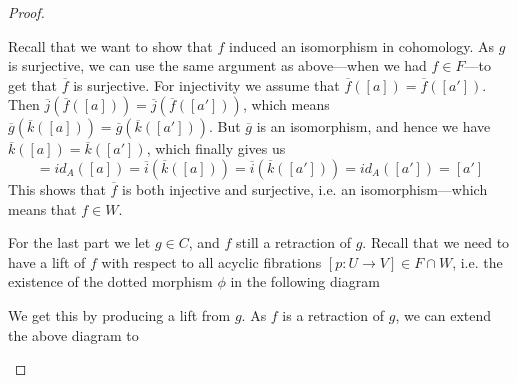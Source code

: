 \begin{proof}
\begin{center}
\end{center}

Recall that we want to show that $f$ induced an isomorphism in cohomology. As $g$ is surjective, we can use the same argument as above---when we had $f\in F$---to get that $\overline{f}$ is surjective. For injectivity we assume that $\overline{f}([a]) = \overline{f}([a'])$. Then $\overline{j}(\overline{f}([a])) = \overline{j}(\overline{f}([a']))$, which means $\overline{g}(\overline{k}([a])) = \overline{g}(\overline{k}([a']))$. But $\overline{g}$ is an isomorphism, and hence we have $\overline{k}([a]) = \overline{k}([a'])$, which finally gives us
\begin{equation*}
    [a] = id_A([a]) = \overline{i}(\overline{k}([a])) = \overline{i}(\overline{k}([a'])) = id_A([a']) = [a']
\end{equation*}
This shows that $\overline{f}$ is both injective and surjective, i.e. an isomorphism---which means that $f\in W$. 

For the last part we let $g\in C$, and $f$ still a retraction of $g$. Recall that we need to have a lift of $f$ with respect to all acyclic fibrations $[p\colon U\longrightarrow V]\in F\cap W$, i.e. the existence of the dotted morphism $\phi$ in the following diagram
\begin{center}
\end{center}

We get this by producing a lift from $g$. As $f$ is a retraction of $g$, we can extend the above diagram to 
\begin{center}
\end{center}
\end{proof}
